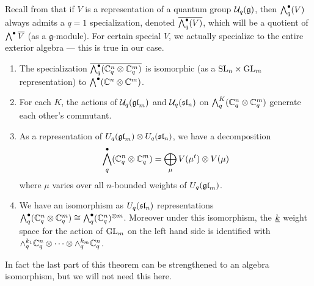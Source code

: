 \documentclass[11pt,leqno]{article}
\begin{document}
Recall from \cite{BW} that if $ V $ is a representation of a quantum group $ \Uq(\mathfrak{g}) $, then $ \Alt^\bullet_q(V) $ always admits a $ q=1 $ specialization, denoted $ \overline{\Alt^\bullet_q(V)}$, which will be a quotient of $ \Alt^\bullet \overline{V} $ (as a $ \mathfrak{g}$-module).  For certain special $ V $, we actually specialize to the entire exterior algebra --- this is true in our case.

\begin{thm} \label{th:qSkewHowe}\mbox{}
\begin{enumerate}
\item The specialization $\overline{\Alt^\bullet_q(\bC_q^n \otimes \bC_q^m)} $ is isomorphic (as a $ \SL_n \times \GL_m $ representation) to $ \Alt^\bullet(\bC^n \otimes \bC^m) $.
\item For each $ K $, the actions of $ \Uq(\gl_m) $ and $ \Uq(\sl_n) $ on $ \Alt^K_q(\bC_q^n \otimes \bC_q^m) $ generate each other's commutant.
\item As a representation of $ U_q(\gl_m) \otimes U_q(\sl_n)  $, we have a decomposition
$$ \Alt^\bullet_q (\mathbb C^n_q \otimes \mathbb C^m_q) = \bigoplus_{\mu} V(\mu^t) \otimes V(\mu) $$
 where $\mu$ varies over all $n$-bounded weights of $ U_q(\gl_m)$.
\item We have an isomorphism as $ U_q(\sl_n) $ representations 
$ \Alt^\bullet_q(\mathbb C^n_q \otimes \mathbb C^m_q) \cong \Alt^\bullet_q(\bC_q^n)^{\otimes m} $.  Moreover under this isomorphism, the $ \ul{k} $ weight space for the action of $ \GL_m $ on the left hand side is identified with $\alt^{k_1}_q \mathbb C_q^n \otimes \cdots \otimes \alt^{k_m}_q \mathbb C_q^n$.
\end{enumerate}
\end{thm}

In fact the last part of this theorem can be strengthened to an algebra isomorphism, but we will not need this here.
\end{document}
